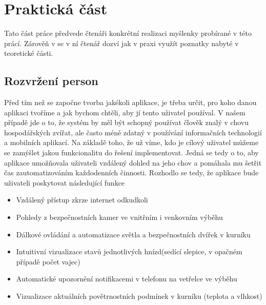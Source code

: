 ﻿


\chapter{Praktická část}\label{ch:prakticka-cast}
Tato část práce předvede čtenáři konkrétní realizaci myšlenky probírané v této prácí.
Zárověň v se v ní čtenář dozví jak v praxi využít poznatky nabyté v teoretické části.


\section{Rozvržení person}\label{sec:rozvrzeni-person}
Před tím než se započne tvorba jakékoli aplikace, je třeba určit, pro koho danou aplikaci tvoříme a jak bychom chtěli, aby jí tento uživatel používal.
V našem případě jde o to, že systém by měl být schopný používat člověk znalý v chovu hospodářských zvířat, ale často méně zdatný v používání informačních technologií a mobilních aplikací.
Na základě toho, že už víme, kdo je cílový uživatel můžeme se zamýšlet jakou funkcionalitu do řešení implementovat.
Jedná se tedy o to, aby aplikace umožňovala uživateli vzdálený dohled na jeho chov a pomáhala mu šetřit čas zautomatizováním každodenních činnosti.
Rozhodlo se tedy, že aplikace bude uživateli poskytovat následující funkce
\begin{itemize}
    \item Vzdálený přístup zkrze internet odkudkoli
    \item Pohledy z bezpečnostních kamer ve vnitřním i venkovním výběhu
    \item Dálkové ovládání a automatizace světla a bezpečnostních dvířek v kurníku
    \item Intuitivní vizualizace stavů jednotlivých hnízd(sedící slepice, v opačném případě počet vajec)
    \item Automatické upozornění notifikacemi v telefonu na vetřelce ve výběhu
    \item Vizualizace aktuálních povětrnostních podmínek v kurníku (teplota a vlhkost)
\end{itemize}


